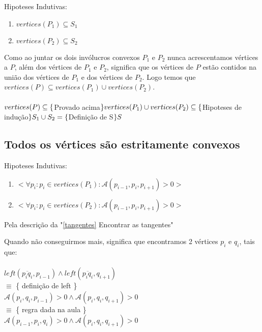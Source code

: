 \documentclass[11pt]{article}
\begin{document}
Hipoteses Indutivas:
\begin{enumerate}
    \item $vertices(P_1) \subseteq S_1$
    \item $vertices(P_2) \subseteq S_2$
\end{enumerate}
Como ao juntar os dois invólucros convexos $P_1$ e $P_2$
nunca acrescentamos vértices a $P$, além dos vértices de $P_1$ e $P_2$, 
significa que os vértices de $P$ estão contidos na 
união dos vértices de $P_1$ e dos vértices de $P_2$.
Logo temos que $vertices(P) \subseteq vertices(P_1) \cup vertices(P_2)$.\\ \\
$vertices(P) \\
\subseteq \{$Provado acima$\}\\
vertices(P_1) \cup vertices(P_2) \\
\subseteq \{$Hipoteses de indução$\} \\
S_1 \cup S_2 \\
= \{$Definição de S$\}\\
S$


\subsection{Todos os vértices são estritamente convexos}

Hipoteses Indutivas:
\begin{enumerate}
    \item $< \forall p_i : p_i \in vertices(P_1) : \mathcal{A}(p_{i-1}, p_i, p_{i+1}) > 0 >$
    \item $< \forall p_i : p_i \in vertices(P_2) : \mathcal{A}(p_{i-1}, p_i, p_{i+1}) > 0 >$
\end{enumerate}


Pela descrição da "\ref{tangentes} Encontrar as tangentes"
\par

Quando não conseguirmos mais, significa que encontramos 2 vértices 
$p_i$ e $q_i$, tais que:\\
\\
$left(\overline{p_i q_i}, p_{i-1}) \wedge left(\overline{p_i q_i}, q_{i+1})$\\
$\equiv$ \{ definição de left \}\\
$\mathcal{A}(p_i, q_i, p_{i-1}) > 0 \wedge \mathcal{A}(p_i, q_i, q_{i+1}) > 0$\\
$\equiv$ \{ regra dada na aula \}\\
$\mathcal{A}(p_{i-1}, p_i, q_i) > 0 \wedge \mathcal{A}(p_i, q_i, q_{i+1}) > 0$\\
\end{document}
